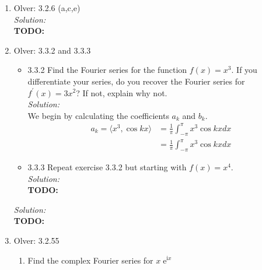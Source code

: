 \documentclass[10pt]{amsart}
\newcommand{\I}{\mathrm{i}}
\DeclareMathOperator{\E}{e}
\theoremstyle{nonumberplain}
\begin{document}
\begin{enumerate}[label={\bf {\arabic*}:}]
\item Olver: 3.2.6 (a,c,e) \\

\noindent
\textit{Solution:} \\
\textbf{TODO:}

\newpage


\item Olver: 3.3.2 and 3.3.3 \\
\begin{itemize}
\item 3.3.2 Find the Fourier series for the function $f(x) = x^3$.
If you differentiate your series, do you recover the Fourier series for $f^\prime(x) = 3x^2$?
If not, explain why not. \\

\noindent
\textit{Solution:} \\
We begin by calculating the coefficients $a_k$ and $b_k$.
\begin{align*}
a_k = \langle x^3, \cos kx \rangle &= \frac 1 \pi \int_{-\pi}^\pi x^3 \cos kx dx \\
	&= \frac 1 \pi \int_{-\pi}^\pi x^3 \cos kx dx
\end{align*}

\item 3.3.3 Repeat exercise 3.3.2 but starting with $f(x) = x^4$. \\
\noindent
\textit{Solution:} \\
\textbf{TODO:}

\end{itemize}

\noindent
\textit{Solution:} \\
\textbf{TODO:}

\newpage


\item Olver: 3.2.55 \\
\begin{enumerate}
\item Find the complex Fourier series for $x\E^{\I x}$ \\


\end{enumerate}
\end{enumerate}
\end{document}
